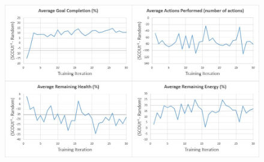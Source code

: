 \begin{appxfig}[H]
\begin{figure}[H]
  \includegraphics[width=0.9\columnwidth]{Figures/Results/TrainingVariation2/Hybrid-MapWater.JPG}
\end{figure}
\caption{Iteration testing performance results for $SCOUt_{H}$ attempting \textit{Map Water} using setup variation 2 (see subsection~\ref{subsec:training_variations}). All graphs show the controller's average difference in performance compared to $Random$ ($SCOUt_{H}$ average - $Random$ average) VS the number of training iterations completed.}
\label{appendix:hybrid_training_mw_variation2}
\end{appxfig}





